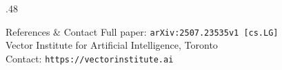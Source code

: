 \documentclass[final,t]{beamer}
\begin{document}
\begin{frame}[t]
\begin{columns}[t]
\begin{column}{.48\linewidth}
\vspace{0.5cm}

\begin{block}{\Large References \& Contact}
\small
Full paper: \texttt{arXiv:2507.23535v1 [cs.LG]}\\
Vector Institute for Artificial Intelligence, Toronto\\
Contact: \texttt{https://vectorinstitute.ai}
\end{block}

\end{column}

\end{columns}
\end{frame}
\end{document}
